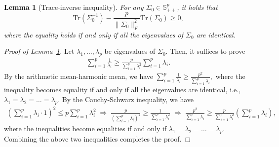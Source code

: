 \documentclass[11pt]{article}
\def\S{\mathbb{S}}
\newtheorem{lemma}{Lemma}
\newcommand{\bgeqn}{\begin{eqnarray}}
\newcommand{\edeqn}{\end{eqnarray}}
\def\S{\mathbb{S}}
\def\tr{\mathrm{Tr}}
\def\PD{{\S^p_{++}}}
\begin{document}
\begin{lemma}[Trace-inverse inequality]\label{lemma:was-nonnegative}
    For any $\Sigma_0\in \PD$, it holds that 
    \[
        \tr(\Sigma_0^{-1}) - \frac{p}{\|\Sigma_0\|_F^2}\tr(\Sigma_0) \geq 0,
    \]
    where the equality holds if and only if all the eigenvalues of $\Sigma_0$ are identical.
\end{lemma}
\begin{proof}[Proof of Lemma~\ref{lemma:was-nonnegative}]
    Let $\lambda_1,\ldots,\lambda_p$ be eigenvalues of $\Sigma_0$. Then, it suffices to prove
    \bgeqn 
        \sum_{i=1}^p \frac{1}{\lambda_i} \geq \frac{p}{\sum_{i=1}^p \lambda_i^2}\sum_{i=1}^p \lambda_i.
    \edeqn
    By the arithmetic mean-harmonic mean, we have
 $
        \sum_{i=1}^p \frac{1}{\lambda_i} \geq \frac{p^2}{\sum_{i=1}^p \lambda_i},
    $
    where the inequality becomes equality if and only if all the eigenvalues are identical, i.e., $\lambda_1=\lambda_2=\ldots=\lambda_p$.
    By the Cauchy-Schwarz inequality, we have 
    \begin{align*}
        \left(\sum_{i=1}^p \lambda_i\cdot 1\right)^2 \leq p\sum_{i=1}^p \lambda_i^2 \;\Rightarrow\; \frac{p}{\left(\sum_{i=1}^p \lambda_i\right)^2} \geq \frac{1}{\sum_{i=1}^p \lambda_i^2}\;\Rightarrow\; \frac{p^2}{\sum_{i=1}^p \lambda_i} \geq \frac{p}{\sum_{i=1}^p \lambda_i^2}\left(\sum_{i=1}^p \lambda_i\right),
    \end{align*}
    where the inequalities become equalities if and only if $\lambda_1=\lambda_2=\ldots=\lambda_p$.
    Combining the above two inequalities completes the proof. 
\end{proof}
\end{document}
